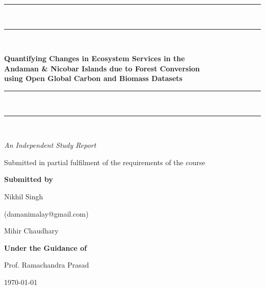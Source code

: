 \documentclass[12pt,a4paper]{article}
\begin{document}
\begin{titlepage}
\centering
\vspace*{1.0cm}
{\color{forestgreen}\rule{\linewidth}{1.5pt}}\\[0.2cm]
{\color{leafgreen}\rule{\linewidth}{0.5pt}}\\[0.8cm]
{\Large\bfseries\color{forestgreen}
Quantifying Changes in Ecosystem Services in the\\
Andaman \& Nicobar Islands due to Forest Conversion\\
using Open Global Carbon and Biomass Datasets\par}
\vspace{0.6cm}
{\color{leafgreen}\rule{\linewidth}{0.5pt}}\\[0.2cm]
{\color{forestgreen}\rule{\linewidth}{1.5pt}}\\[1.0cm]
{\large\itshape An Independent Study Report\par}
\vspace{0.4cm}
{\normalsize Submitted in partial fulfilment of the requirements of the course\par}
\vspace{1.8cm}
{\large\bfseries\color{earthbrown} Submitted by\par}
\vspace{0.3cm}
{\large Nikhil Singh\par}
{\normalsize (damanimalay@gmail.com)\par}
\vspace{0.4cm}
{\large Mihir Chaudhary\par}
\vspace{1.2cm}
{\large\bfseries\color{earthbrown} Under the Guidance of\par}
\vspace{0.3cm}
{\large Prof. Ramachandra Prasad\par}
\vfill
{\normalsize\color{seablue}\today\par}
\vspace{0.5cm}
\end{titlepage}

\end{document}
